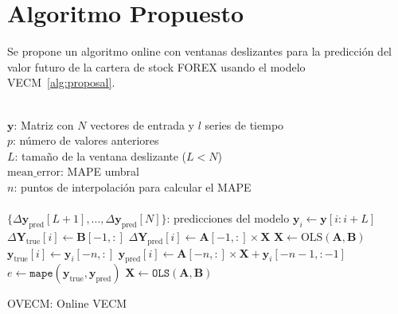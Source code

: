 \section{Algoritmo Propuesto}

Se propone un algoritmo online con ventanas deslizantes para la predicción del
valor futuro de la cartera de stock FOREX usando el modelo VECM~\ref{alg:proposal}. 

\begin{algorithm}[h!]
\begin{algorithmic}[1]
\REQUIRE $\,$ \\
$\mathbf{y}$: Matriz con $N$ vectores de entrada y $l$ series de tiempo\\
$p$: número de valores anteriores \\
$L$: tamaño de la ventana deslizante ($L<N$) \\
$\text{mean\_error}$: MAPE umbral \\
$n$: puntos de interpolación para calcular el MAPE\\
\ENSURE  $\,$ \\
$\{\Delta \mathbf{y}_{\text{pred}}[L+1],\dots,\Delta \mathbf{y}_{\text{pred}}[N]\}$: predicciones del modelo
    \STATE $\mathbf{y}_i \gets \mathbf{y}[i:i+L]$
    \ELSE
        \STATE $\Delta \mathbf{Y}_{\text{true}}[i] \gets \mathbf{B}[-1,:]$
        \STATE $\Delta \mathbf{Y}_{\text{pred}}[i] \gets \mathbf{A}[-1,:] \times \mathbf{X}$
    \ENDIF
    \STATE $\mathbf{X} \gets \text{OLS} (\mathbf{A},\mathbf{B})$
    \STATE $\mathbf{y}_{\text{true}}[i] \gets \mathbf{y}_i[-n,:]$
    \STATE $\mathbf{y}_{\text{pred}}[i] \gets \mathbf{A}[-n,:] \times \mathbf{X} + \mathbf{y}_i[-n-1,:-1]$
    \STATE $e \gets \texttt{mape}(\mathbf{y}_{\text{true}}, \mathbf{y}_{\text{pred}})$
        \STATE $\mathbf{X} \gets \texttt{OLS} (\mathbf{A},\mathbf{B})$
    \ENDIF
\ENDFOR
\end{algorithmic}
\caption{OVECM: Online VECM}
\label{alg:proposal}
\end{algorithm}

